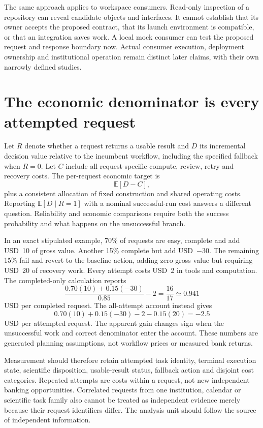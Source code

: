 The same approach applies to workspace consumers. Read-only inspection of a
repository can reveal candidate objects and interfaces. It cannot establish
that its owner accepts the proposed contract, that its launch environment is
compatible, or that an integration saves work. A local mock consumer can test
the proposed request and response boundary now. Actual consumer execution,
deployment ownership and institutional operation remain distinct later
claims, with their own narrowly defined studies.

\section{The economic denominator is every attempted request}

Let $R$ denote whether a request returns a usable result and $D$ its incremental
decision value relative to the incumbent workflow, including the specified
fallback when $R=0$. Let $C$ include all request-specific compute, review,
retry and recovery costs. The per-request economic target is
\[
 \mathbb E[D-C],
\]
plus a consistent allocation of fixed construction and shared operating
costs. Reporting $\mathbb E[D\mid R=1]$ with a nominal successful-run cost
answers a different question. Reliability and economic comparisons require
both the success probability and what happens on the unsuccessful branch.

In an exact stipulated example, 70\% of requests are easy, complete and add
USD~10 of gross value. Another 15\% complete but add USD~$-30$. The remaining
15\% fail and revert to the baseline action, adding zero gross value but
requiring USD~20 of recovery work. Every attempt costs USD~2 in tools and
computation. The completed-only calculation reports
\[
 \frac{0.70(10)+0.15(-30)}{0.85}-2
 =\frac{16}{17}\simeq0.941
\]
USD per completed request. The all-attempt account instead gives
\[
 0.70(10)+0.15(-30)-2-0.15(20)=-2.5
\]
USD per attempted request. The apparent gain changes sign when the
unsuccessful work and correct denominator enter the account. These numbers
are generated planning assumptions, not workflow prices or measured bank
returns\cite{exec13_ops_exact}.

Measurement should therefore retain attempted task identity, terminal
execution state, scientific disposition, usable-result status, fallback
action and disjoint cost categories. Repeated attempts are costs within a
request, not new independent banking opportunities. Correlated requests from
one institution, calendar or scientific task family also cannot be treated
as independent evidence merely because their request identifiers differ.
The analysis unit should follow the source of independent information.

